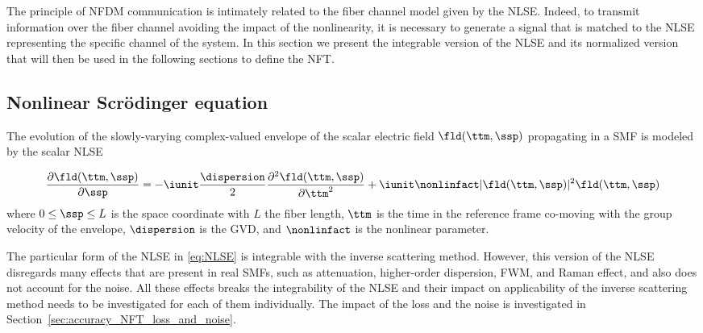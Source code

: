 The principle of \ac{NFDM} communication is intimately related to the fiber channel model given by the \ac{NLSE}. Indeed, to transmit information over the fiber channel avoiding the impact of the nonlinearity, it is necessary to generate a signal that is matched to the \ac{NLSE} representing the specific channel of the system. In this section we present the integrable version of the \ac{NLSE} and its normalized version that will then be used in the following sections to define the \ac{NFT}.

\subsection{Nonlinear Scr\"odinger equation}

The evolution of the slowly-varying complex-valued envelope of the scalar electric
field $\fld(\ttm,\ssp)$ propagating in a \ac{SMF} is modeled by the scalar \ac{NLSE} \cite{Agrawal12_NonlinearFOs_Book}
\begin{extendedthesis}
\cite[eq.~(2.3.46)]{Agrawal12_NonlinearFOs_Book}
\end{extendedthesis}


\begin{equation}\label{eq:NLSE}
  \frac{\partial \fld(\ttm,\ssp)}{\partial \ssp} =
    - \iunit \dfrac{\dispersion}{2}\dfrac{\partial^2\fld(\ttm,\ssp)}{\partial \ttm^2}
    + \iunit \nonlinfact |\fld(\ttm,\ssp)|^2 \fld(\ttm,\ssp)
\end{equation}
where $0\leq \ssp\leq L$ is the space coordinate with $L$ the fiber length,
$\ttm$ is the time in the reference frame co-moving with the group velocity of
the envelope, $\dispersion$ is the \ac{GVD}, and $\nonlinfact$
is the nonlinear parameter.

The particular form of the \ac{NLSE} in \eqref{eq:NLSE} is integrable with the inverse scattering method. However, this version of the \ac{NLSE} disregards many effects that are present in real \acp{SMF}, such as
attenuation, higher-order dispersion, \ac{FWM}, and Raman effect, and also does not account for the noise. All these effects breaks the integrability of the \ac{NLSE} and their impact on applicability of the inverse scattering method needs to be investigated for each of them individually. The impact of the loss and the noise is investigated in Section~\ref{sec:accuracy_NFT_loss_and_noise}.

